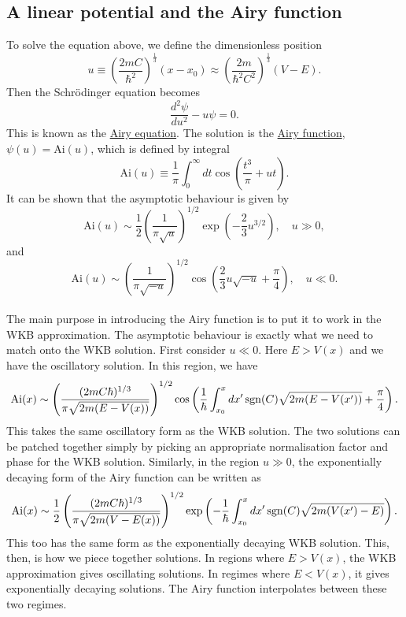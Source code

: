 \subsection{A linear potential and the Airy function}
To solve the equation above, we define the dimensionless position
\[u \equiv (\frac{2mC}{\hbar^2})^{\frac{1}{3}} (x - x_0) \approx  (\frac{2m}{\hbar^2 C^2})^{\frac{1}{3}} (V - E).\]
Then the Schr\"{o}dinger equation becomes
\[\frac{d^2\psi}{du^2} - u\psi = 0.\]
This is known as the \href{http://mathworld.wolfram.com/AiryDifferentialEquation.html}{Airy equation}. The solution is the \href{http://mathworld.wolfram.com/AiryFunctions.html} {Airy function}, $\psi(u) = \mathrm{Ai}(u)$,
which is defined by integral
\[\mathrm{Ai}(u) \equiv  \frac{1}{\pi} \int_0^{\infty} dt \cos\left( \frac{t^3}{\pi} + ut \right) .\]
It can be shown that the asymptotic behaviour is given by
\[\mathrm{Ai}(u) \sim \frac{1}{2} \left( \frac{1}{\pi \sqrt{u}} \right)^{1/2} \exp\left( -\frac{2}{3} u^{3/2} \right) , \quad u \gg 0,\]
and
\[\mathrm{Ai}(u) \sim \left( \frac{1}{\pi \sqrt{-u}} \right)^{1/2} \cos\left( \frac{2}{3} u\sqrt{-u} + \frac{\pi}{4}\right) , \quad u \ll 0.\]
\\
The main purpose in introducing the Airy function is to put it to work in the WKB approximation. The asymptotic behaviour is exactly what we need to match onto the WKB solution. First consider $u \ll 0$. Here $E > V (x)$ and we have the oscillatory solution. In this region, we have
\[\mathrm{Ai}(x) \sim \left( \frac{(2mC\hbar)^{1/3}}{\pi \sqrt{2m(E-V(x))}} \right)^{1/2} \cos \left( \frac{1}{\hbar} \int_{x_0}^x dx' \mathop{\rm sgn}(C) \sqrt{2m(E-V(x'))} + \frac{\pi}{4} \right) .\]
This takes the same oscillatory form as the WKB solution. The two solutions can be patched together simply by picking an appropriate normalisation factor and phase for the WKB solution.
Similarly, in the region $u \gg 0$, the exponentially decaying form of the Airy function can be written as
\[\mathrm{Ai}(x) \sim \frac{1}{2} \left( \frac{(2mC\hbar)^{1/3}}{\pi \sqrt{2m(V-E(x))}} \right)^{1/2} \exp \left( -\frac{1}{\hbar} \int_{x_0}^x dx' \mathop{\rm sgn}(C) \sqrt{2m(V(x') - E)} \right) .\]
This too has the same form as the exponentially decaying WKB solution. This, then, is how we piece together solutions. In regions where $E > V(x)$, the WKB approximation gives oscillating solutions. 
In regimes where $E < V(x)$, it gives exponentially decaying solutions. 
The Airy function interpolates between these two regimes.


